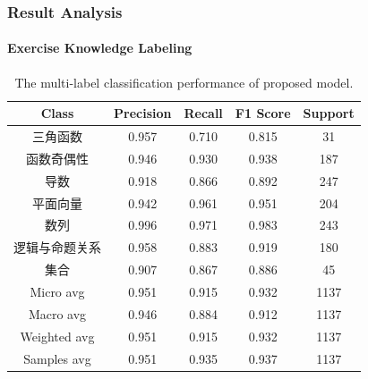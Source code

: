 \documentclass[10pt,aspectratio=43,mathserif]{beamer}
\begin{document}
\begin{frame}
	\frametitle{Result Analysis}
	\framesubtitle{Exercise Knowledge Labeling}
	\begin{table}[htbp!]
		\caption{The multi-label classification performance of proposed model.}\label{tbl:ch2-result-detail}
		\centering
		\begin{tabular}{ccccc}
			\toprule
			Class          & Precision & Recall & F1 Score & Support \\
			\midrule
			三角函数       & 0.957     & 0.710  & 0.815    & 31      \\
			函数奇偶性     & 0.946     & 0.930  & 0.938    & 187     \\
			导数           & 0.918     & 0.866  & 0.892    & 247     \\
			平面向量       & 0.942     & 0.961  & 0.951    & 204     \\
			数列           & 0.996     & 0.971  & 0.983    & 243     \\
			逻辑与命题关系 & 0.958     & 0.883  & 0.919    & 180     \\
			集合           & 0.907     & 0.867  & 0.886    & 45      \\
			\midrule
			Micro avg      & 0.951     & 0.915  & 0.932    & 1137    \\
			Macro avg      & 0.946     & 0.884  & 0.912    & 1137    \\
			Weighted avg   & 0.951     & 0.915  & 0.932    & 1137    \\
			Samples avg    & 0.951     & 0.935  & 0.937    & 1137    \\
			\bottomrule
		\end{tabular}
	\end{table}
\end{frame}
\end{document}
